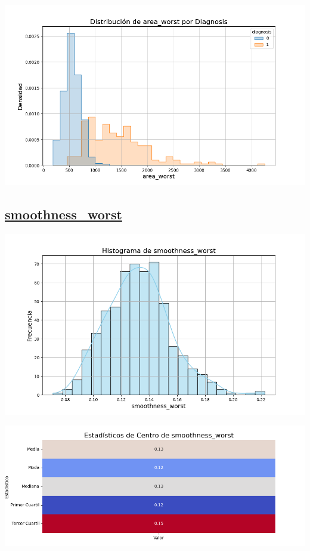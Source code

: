 \documentclass[a4paper, 12pt]{article}
\begin{document}
\includegraphics[width=\textwidth]{../Plots/plots_diagnosis/distribucion_area_worst_por_diagnosis.png}

\subsection*{\underline{smoothness\_worst}}

	\includegraphics[width=\textwidth]{../Plots/plots_stats/smoothness_worst/histograma_smoothness_worst.png}




\includegraphics[width=\textwidth]{../Plots/plots_stats/smoothness_worst/estadisticas_centro_smoothness_worst.png}
\end{document}
